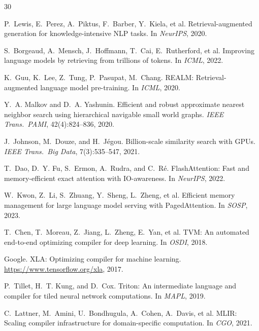 \documentclass{article}
\theoremstyle{definition}
\theoremstyle{remark}
\begin{document}

\begin{thebibliography}{30}

P.~Lewis, E.~Perez, A.~Piktus, F.~Barber, Y.~Kiela, et al.
\newblock Retrieval-augmented generation for knowledge-intensive NLP tasks.
\newblock In \emph{NeurIPS}, 2020.

S.~Borgeaud, A.~Mensch, J.~Hoffmann, T.~Cai, E.~Rutherford, et al.
\newblock Improving language models by retrieving from trillions of tokens.
\newblock In \emph{ICML}, 2022.

K.~Guu, K.~Lee, Z.~Tung, P.~Pasupat, M.~Chang.
\newblock REALM: Retrieval-augmented language model pre-training.
\newblock In \emph{ICML}, 2020.

Y.~A. Malkov and D.~A. Yashunin.
\newblock Efficient and robust approximate nearest neighbor search using hierarchical navigable small world graphs.
\newblock \emph{IEEE Trans.\ PAMI}, 42(4):824--836, 2020.

J.~Johnson, M.~Douze, and H.~J\'egou.
\newblock Billion-scale similarity search with GPUs.
\newblock \emph{IEEE Trans.\ Big Data}, 7(3):535--547, 2021.

T.~Dao, D.~Y. Fu, S.~Ermon, A.~Rudra, and C.~R\'e.
\newblock FlashAttention: Fast and memory-efficient exact attention with IO-awareness.
\newblock In \emph{NeurIPS}, 2022.

W.~Kwon, Z.~Li, S.~Zhuang, Y.~Sheng, L.~Zheng, et al.
\newblock Efficient memory management for large language model serving with PagedAttention.
\newblock In \emph{SOSP}, 2023.

T.~Chen, T.~Moreau, Z.~Jiang, L.~Zheng, E.~Yan, et al.
\newblock TVM: An automated end-to-end optimizing compiler for deep learning.
\newblock In \emph{OSDI}, 2018.

Google.
\newblock XLA: Optimizing compiler for machine learning.
\newblock \url{https://www.tensorflow.org/xla}, 2017.

P.~Tillet, H.~T. Kung, and D.~Cox.
\newblock Triton: An intermediate language and compiler for tiled neural network computations.
\newblock In \emph{MAPL}, 2019.

C.~Lattner, M.~Amini, U.~Bondhugula, A.~Cohen, A.~Davis, et al.
\newblock MLIR: Scaling compiler infrastructure for domain-specific computation.
\newblock In \emph{CGO}, 2021.


\end{thebibliography}
\end{document}

